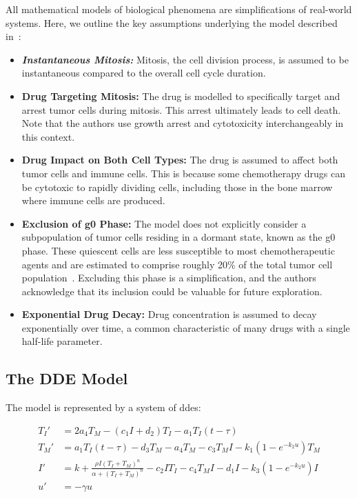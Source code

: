 All mathematical models of biological phenomena are simplifications of real-world systems. Here, we outline the key assumptions underlying the model described in~\cite{villasana_delay_2003}:

\begin{itemize}
    \item \textbf{\textit{Instantaneous Mitosis:}} Mitosis, the cell division process, is assumed to be instantaneous compared to the overall cell cycle duration.
    \item \textbf{Drug Targeting Mitosis:} The drug is modelled to specifically target and arrest tumor cells during mitosis. This arrest ultimately leads to cell death. Note that the authors use \gls{growth arrest} and cytotoxicity interchangeably in this context.
    \item \textbf{Drug Impact on Both Cell Types:} The drug is assumed to affect both tumor cells and immune cells. This is because some \gls{chemotherapy} drugs can be cytotoxic to rapidly dividing cells, including those in the bone marrow where immune cells are produced.~\cite{villasana_delay_2003}
    \item \textbf{Exclusion of \gls{g0} Phase: } The model does not explicitly consider a subpopulation of tumor cells residing in a dormant state, known as the \gls{g0} phase. These quiescent cells are less susceptible to most chemotherapeutic agents and are estimated to comprise roughly 20\% of the total tumor cell population~\cite{villasana_delay_2003}. Excluding this phase is a simplification, and the authors acknowledge that its inclusion could be valuable for future exploration.
    \item \textbf{Exponential Drug Decay: } Drug concentration is assumed to decay exponentially over time, a common characteristic of many drugs with a single \gls{half-life} parameter. 
\end{itemize}

\subsection{The DDE Model} \label{the model}

The model is represented by a system of \gls{dde}s:

\begin{align*}
    T_I' &= 2a_4T_M-(c_1I + d_2)T_I-a_1T_I(t-\tau)\\
    T_M' &= a_1T_I(t-\tau)-d_3T_M - a_4T_M - c_3T_MI-k_1(1-e^{-k_2u})T_M\\
    I' &= k + \frac{\rho I (T_I + T_M)^n}{\alpha + (T_I + T_M)^n} - c_2IT_I - c_4T_MI -d_1I - k_3(1-e^{-k_2u})I\\
    u' &= -\gamma u
\end{align*}

